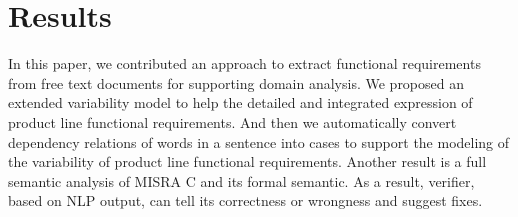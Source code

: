 \section{Results}
\begin{minipage}{\linewidth}
	\begin{multicols*}{2}
		In this paper, we contributed an approach to extract functional requirements from free text documents for supporting domain analysis. We proposed an extended variability model to help the detailed and integrated expression of product line functional requirements. And then we automatically convert dependency relations of words in a sentence into cases to support the modeling of the variability of product line functional requirements.
		Another result is a full semantic analysis of \gls{MISRA} C and its formal semantic. 
		As a result, verifier, based on \gls{NLP} output, can tell its correctness or wrongness and suggest fixes. 
	\end{multicols*}
\end{minipage}
